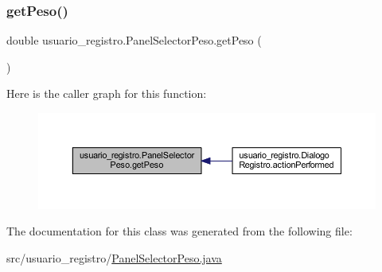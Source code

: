 \mbox{\label{classusuario__registro_1_1_panel_selector_peso_ae7d3c53e5691340a0a9ec48c9eec9aa4}} 
\subsubsection{\texorpdfstring{get\+Peso()}{getPeso()}}
{\footnotesize\ttfamily double usuario\+\_\+registro.\+Panel\+Selector\+Peso.\+get\+Peso (\begin{DoxyParamCaption}{ }\end{DoxyParamCaption})}

Here is the caller graph for this function\+:
\nopagebreak
\begin{figure}[H]
\begin{center}
\leavevmode
\includegraphics[width=350pt]{classusuario__registro_1_1_panel_selector_peso_ae7d3c53e5691340a0a9ec48c9eec9aa4_icgraph}
\end{center}
\end{figure}


The documentation for this class was generated from the following file\+:\begin{DoxyCompactItemize}
\item 
src/usuario\+\_\+registro/\mbox{\hyperlink{_panel_selector_peso_8java}{Panel\+Selector\+Peso.\+java}}\end{DoxyCompactItemize}
